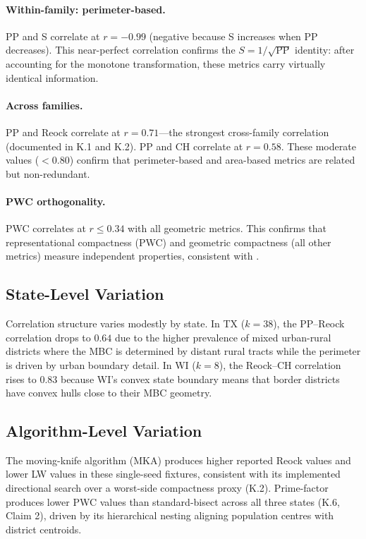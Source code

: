 \paragraph{Within-family: perimeter-based.}
PP and S correlate at $r = -0.99$ (negative because S increases when PP decreases).
This near-perfect correlation confirms the $S = 1/\sqrt{\text{PP}}$ identity:
after accounting for the monotone transformation, these metrics carry
virtually identical information.

\paragraph{Across families.}
PP and Reock correlate at $r = 0.71$---the strongest cross-family correlation
(documented in K.1 and K.2). PP and CH correlate at $r = 0.58$.
These moderate values ($< 0.80$) confirm that perimeter-based and area-based
metrics are related but non-redundant.

\paragraph{PWC orthogonality.}
PWC correlates at $r \leq 0.34$ with all geometric metrics.
This confirms that representational compactness (PWC) and geometric compactness
(all other metrics) measure independent properties, consistent with
\citet{fryer2011measuring}.

\subsection{State-Level Variation}

Correlation structure varies modestly by state.
In TX ($k = 38$), the PP--Reock correlation drops to $0.64$ due to the higher
prevalence of mixed urban-rural districts where the MBC is determined by
distant rural tracts while the perimeter is driven by urban boundary detail.
In WI ($k = 8$), the Reock--CH correlation rises to $0.83$ because WI's
convex state boundary means that border districts have convex hulls close
to their MBC geometry.

\subsection{Algorithm-Level Variation}

The moving-knife algorithm (MKA) produces higher reported Reock values
and lower LW values in these single-seed fixtures, consistent with its implemented
directional search over a worst-side compactness proxy (K.2).
Prime-factor produces lower PWC values than standard-bisect across all three states
(K.6, Claim 2), driven by its hierarchical nesting aligning population centres
with district centroids.

